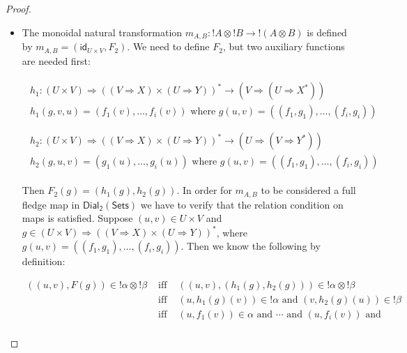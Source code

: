 \documentclass{elsarticle}
\newcommand{\dial}[0]{\mathsf{Dial_2}(\mathsf{Sets})}
\newcommand{\id}[0]{\mathsf{id}}
\begin{document}
\begin{proof}
\begin{report}
\begin{center}
\begin{itemize}
    \item The monoidal natural transformation
      $m_{A,B} : !A \otimes !B \to !(A \otimes B)$ is defined by
      $m_{A,B} = (\id_{U \times V},F_2)$. We need to define $F_2$,
      but two auxiliary functions are needed first:
      \begin{center}
        \begin{math}
          \begin{array}{lll}
            \begin{array}{lll}
              h_1 : (U \times V) \Rightarrow ((V \Rightarrow X) \times (U \Rightarrow Y))^* \to 
                    (V \Rightarrow (U \Rightarrow X^*))\\
              h_1(g,v,u) = (f_1(v),\ldots,f_i(v))
              \text{ where } g(u,v) = ((f_1,g_1),\ldots,(f_i,g_i))
            \end{array}
            \\
            &  \\
            \begin{array}{lll}
              h_2 : (U \times V) \Rightarrow ((V \Rightarrow X) \times (U \Rightarrow Y))^* \to 
                    (U \Rightarrow (V \Rightarrow Y^*))\\
              h_2(g,u,v) = (g_1(u),\ldots,g_i(u))
              \text{ where } g(u,v) = ((f_1,g_1),\ldots,(f_i,g_i))
            \end{array}
          \end{array}
        \end{math}
      \end{center}
      Then $F_2(g) = (h_1(g),h_2(g))$.  In order for $m_{A,B}$ to be
      considered a full fledge map in $\dial$ we have to verify that
      the relation condition on maps is satisfied.  Suppose $(u,v) \in U \times V$ and 
      $g \in (U \times V) \Rightarrow ((V \Rightarrow X) \times (U \Rightarrow Y))^*$, 
      where $g(u,v) = ((f_1,g_1), \ldots,(f_i,g_i))$. Then we know the following by definition:
      \begin{center}
        \begin{math}
          \begin{array}{lll}
            ((u,v),F(g)) \in !\alpha \otimes !\beta 
            & \text{ iff } & ((u,v),(h_1(g),h_2(g))) \in !\alpha \otimes !\beta\\
            & \text{ iff } & (u,h_1(g)(v)) \in !\alpha \text{ and } (v,h_2(g)(u)) \in !\beta\\
            & \text{ iff } & (u,f_1(v)) \in \alpha \text{ and } \cdots \text{ and } (u,f_i(v)) \text{ and }\\

\end{array}
\end{math}
\end{center}
\end{itemize}
\end{center}
\end{report}
\end{proof}
\end{document}
